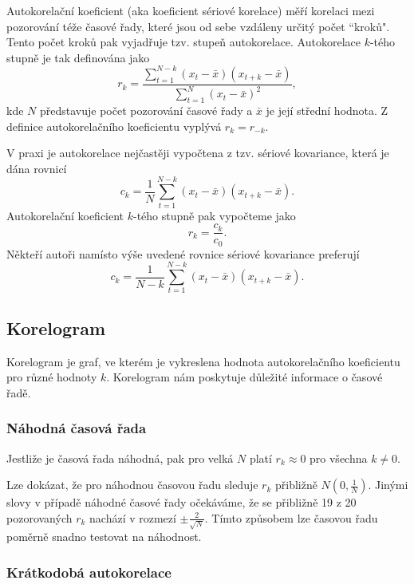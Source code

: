 Autokorelační koeficient (aka koeficient sériové korelace) měří korelaci mezi pozorování téže časové řady, které jsou od sebe vzdáleny určitý počet ``kroků". Tento počet kroků pak vyjadřuje tzv. stupeň autokorelace. Autokorelace $k$-tého stupně je tak definována jako
\begin{equation}
r_k = \frac{\sum_{t = 1}^{N - k}(x_t - \bar{x})(x_{t + k} - \bar{x})}{\sum_{t = 1}^N (x_t - \bar{x})^2},
\end{equation}
kde $N$ představuje počet pozorování časové řady a $\bar{x}$ je její střední hodnota. Z definice autokorelačního koeficientu vyplývá $r_k = r_{-k}$.

V praxi je autokorelace nejčastěji vypočtena z tzv. sériové kovariance, která je dána rovnicí
\begin{equation}
c_k = \frac{1}{N} \sum_{t = 1}^{N - k}(x_t - \bar{x})(x_{t + k} - \bar{x}).
\end{equation}
Autokorelační koeficient $k$-tého stupně pak vypočteme jako
\begin{equation}
r_k = \frac{c_k}{c_0}.
\end{equation}
Někteří autoři namísto výše uvedené rovnice sériové kovariance preferují
\begin{equation}
c_k = \frac{1}{N - k} \sum_{t = 1}^{N - k}(x_t - \bar{x})(x_{t + k} - \bar{x}).
\end{equation}

\subsection{Korelogram}

Korelogram je graf, ve kterém je vykreslena hodnota autokorelačního koeficientu pro různé hodnoty $k$. Korelogram nám poskytuje důležité informace o časové řadě.

\subsubsection{Náhodná časová řada}

Jestliže je časová řada náhodná, pak pro velká $N$ platí $r_k \approx 0$ pro všechna $k \ne 0$.

Lze dokázat, že pro náhodnou časovou řadu sleduje $r_k$ přibližně $N(0, \frac{1}{N})$. Jinými slovy v případě náhodné časové řady očekáváme, že se přibližně 19 z 20 pozorovaných $r_k$ nachází v rozmezí $\pm \frac{2}{\sqrt{N}}$. Tímto způsobem lze časovou řadu poměrně snadno testovat na náhodnost.

\subsubsection{Krátkodobá autokorelace}

